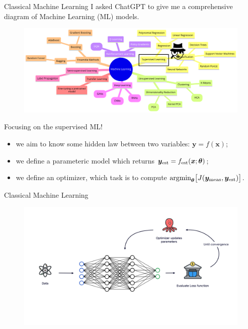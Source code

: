 \documentclass[8pt, xcolor={svgnames}, hyperref={linkcolor=black}]{beamer}
\begin{document}
\begin{frame}{Classical Machine Learning}
I asked ChatGPT to give me a comprehensive diagram of Machine Learning (ML) models.
\begin{figure}
   \includegraphics[width=1\linewidth, height=0.5\textheight]{figures/supervised.png}
\end{figure}  
Focusing on the supervised ML!
\begin{itemize}[noitemsep]
\item[\faCrosshairs] we aim to know some hidden law between two variables: $\bm{y}=f(\bm{x})$;
\item[\faBarChart] we define a parameteric model which returns $\bm{y}_{\rm est}=f_{\rm est}(\bm{x}; \bm{\theta})$;
\item[\faBinoculars] we define an optimizer, which task is to compute 
   $\text{argmin}_{\bm{\theta}}\bigl[J(\bm{y}_{\rm meas}, \bm{y}_{\rm est})\bigr]$.
\end{itemize}
\end{frame}

\begin{frame}{Classical Machine Learning}
\begin{figure}
   \includegraphics[width=1\linewidth]{figures/ml_scheme.png}
\end{figure}  
\end{frame}
\end{document}
